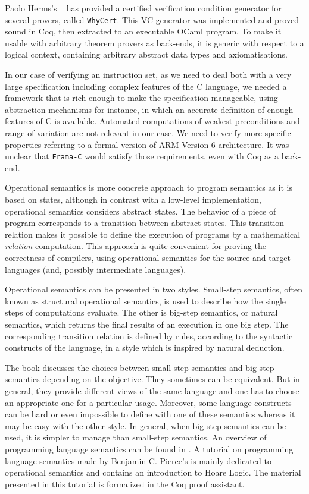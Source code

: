 \documentclass[a4paper, conference]{IEEEtran}
\newcommand{\whyCert}{\texttt{WhyCert}\xspace}
\newcommand{\framac}{\texttt{Frama-C}\xspace}
\begin{document}
Paolo Herms's \cite{herms13phd}~\cite{herms2012certified} has provided
a certified verification condition generator for several provers,
called \whyCert.  This VC generator was implemented and proved sound
in Coq, then extracted to an executable OCaml program.  To make it
usable with arbitrary theorem provers as back-ends, it is generic with
respect to a logical context, containing arbitrary abstract data types
and axiomatisations.

In our case of verifying an instruction set, as we need to deal both
with a very large specification including complex features of the C
language, we needed a framework that is rich enough to make the
specification manageable, using abstraction mechanisms for instance,
in which an accurate definition of enough features of C is available.
Automated computations of weakest preconditions
and range of variation are not relevant in our case.
We need to verify more specific properties referring
to a formal version of ARM Version 6 architecture.
It was unclear that \framac would satisfy those requirements,
even with Coq as a back-end.

Operational semantics is more concrete approach to program semantics
as it is based on states, although in contrast with a low-level
implementation, operational semantics considers abstract states.  The
behavior of a piece of program corresponds to a transition between
abstract states.  This transition relation makes it possible to define
the execution of programs by a mathematical \emph{relation}
computation.  This approach is quite convenient for proving the
correctness of compilers, using operational semantics for the source
and target languages (and, possibly intermediate languages).

Operational semantics can be presented in two styles.  Small-step
semantics\cite{smallstep}, often known as structural operational semantics, is
used to describe how the single steps of computations evaluate.  The
other is big-step semantics\cite{bigstep}, or natural semantics, which
returns the final results of an execution in one big step.  The
corresponding transition relation is defined by rules, according to
the syntactic constructs of the language, in a style which is inspired
by natural deduction.

The book \cite{nielson1992semantics} discusses the choices between
small-step semantics and big-step semantics depending on the objective.
They sometimes can be equivalent.  But in general, they provide
different views of the same language and one has to choose an
appropriate one for a particular usage.  Moreover, some language
constructs can be hard or even impossible to define with one of these
semantics whereas it may be easy with the other style.  In general, when
big-step semantics can be used, it is simpler to manage than
small-step semantics. An overview of programming language semantics can be found in
\cite{nielson1992semantics}.  A tutorial on programming language
semantics made by Benjamin C. Pierce's \cite{pierce}
is mainly dedicated to operational semantics and contains an
introduction to Hoare Logic.  The material presented in this tutorial
is formalized in the Coq proof assistant.
\end{document}
